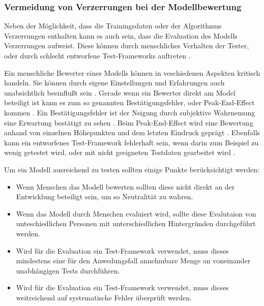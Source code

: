 \documentclass[12pt]{article}
\begin{document}
\subsubsection{Vermeidung von Verzerrungen bei der Modellbewertung}
Neben der Möglichkeit, dass die Trainingsdaten oder der Algorithmus Verzerrungen enthalten kann es auch sein, dass die Evaluation des Modells Verzerrungen aufweist.
Diese können durch menschliches Verhalten der Tester, oder durch schlecht entworfene Test-Frameworks auftreten \cite{Srinivasan}.

Ein menschliche Bewerter eines Modells können in veschiedenen Aspekten kritisch handeln. Sie können durch eigene Einstellungen und Erfahrungen auch unabsichtlich beeinflußt sein \cite{Srinivasan}.
Gerade wenn ein Bewerter direkt am Model beteiligt ist kann es zum so genannten Bestätigungsfehler, oder \glqq Peak-End-Effect\grqq{} kommen \cite{Srinivasan}.
Ein Bestätigungsfehler ist der Neigung durch subjektive Wahrnemung eine Erwartung bestätigt zu sehen \cite{Srinivasan}. 
Beim \glqq Peak-End-Effect\grqq{} wird eine Bewertung anhand von einzelnen Höhepunkten und dem letzten Eindruck geprägt \cite{Srinivasan}.
Ebenfalls kann ein entworfenes Test-Framework fehlerhaft sein, wenn darin zum Beispiel zu wenig getestet wird, oder mit nicht geeigneten Testdaten gearbeitet wird \cite{Srinivasan}.

Um ein Modell ausreichend zu testen sollten einige Punkte berücksichtigt werden:
\begin{itemize}
    \item Wenn Menschen das Modell bewerten sollten diese nicht direkt an der Entwicklung beteiligt sein, um so Neutralität zu wahren.
    \item Wenn das Modell durch Menschen evaluiert wird, sollte diese Evalutaion von unteschiedlichen Personen mit unterschiedlichen Hintergründen durchgeführt werden.
    \item Wird für die Evaluation ein Test-Framework verwendet, muss dieses mindestens eine für den Anwedungsfall annehmbare Menge an voneinander unabhängigen Tests durchführen.
    \item Wird für die Evaluation ein Test-Framework verwendet, muss dieses weitreichend auf systematische Fehler überprüft werden.
\end{itemize}
\end{document}
